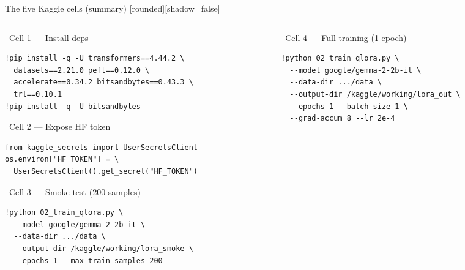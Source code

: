 \documentclass[aspectratio=169, 10pt]{beamer}
\begin{document}
\begin{frame}[fragile]{The five Kaggle cells (summary)}
  [rounded][shadow=false]
  \begin{columns}[T]
    \begin{column}{0.48\textwidth}
      \begin{block}{\faCog\ Cell 1 --- Install deps}
      \begin{lstlisting}[style=kcell]
!pip install -q -U transformers==4.44.2 \
  datasets==2.21.0 peft==0.12.0 \
  accelerate==0.34.2 bitsandbytes==0.43.3 \
  trl==0.10.1
!pip install -q -U bitsandbytes
      \end{lstlisting}
      \end{block}
      \vspace{-2mm}
      \begin{block}{\faKey\ Cell 2 --- Expose HF token}
      \begin{lstlisting}[style=kcell]
from kaggle_secrets import UserSecretsClient
os.environ["HF_TOKEN"] = \
  UserSecretsClient().get_secret("HF_TOKEN")
      \end{lstlisting}
      \end{block}
      \vspace{-2mm}
      \begin{block}{\faFlask\ Cell 3 --- Smoke test (200 samples)}
      \begin{lstlisting}[style=kcell]
!python 02_train_qlora.py \
  --model google/gemma-2-2b-it \
  --data-dir .../data \
  --output-dir /kaggle/working/lora_smoke \
  --epochs 1 --max-train-samples 200
      \end{lstlisting}
      \end{block}
    \end{column}
    \begin{column}{0.48\textwidth}
      \begin{exampleblock}{\faRocket\ Cell 4 --- Full training (1 epoch)}
      \begin{lstlisting}[style=kcell]
!python 02_train_qlora.py \
  --model google/gemma-2-2b-it \
  --data-dir .../data \
  --output-dir /kaggle/working/lora_out \
  --epochs 1 --batch-size 1 \
  --grad-accum 8 --lr 2e-4
      \end{lstlisting}
      \end{exampleblock}

\end{column}
\end{columns}
\end{frame}
\end{document}
